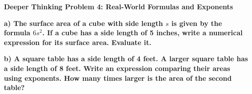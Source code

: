 \documentclass[12pt, letterpaper, fleqn]{article}
\begin{document}
\begin{tcolorbox}[colback=black!5, colframe=black!50, boxrule=1pt, arc=4mm, left=6mm, right=6mm, top=5mm, bottom=5mm]
\textbf{Deeper Thinking Problem 4: Real-World Formulas and Exponents}

\medskip

\noindent
\textbf{a) The surface area of a cube with side length $s$ is given by the formula $6s^2$. If a cube has a side length of 5 inches, write a numerical expression for its surface area. Evaluate it.}

\vspace{2.5cm}

\noindent
\textbf{b) A square table has a side length of 4 feet. A larger square table has a side length of 8 feet. Write an expression comparing their areas using exponents. How many times larger is the area of the second table?}

\vspace{2.5cm}
\end{tcolorbox}
\end{document}
